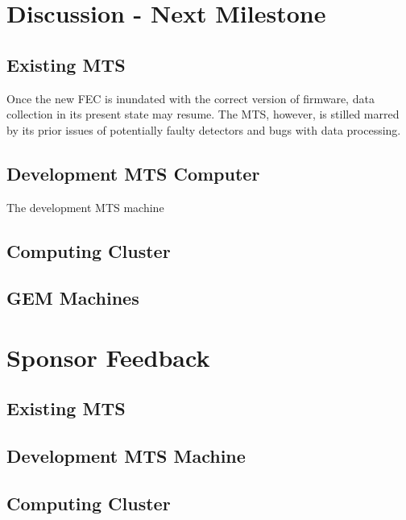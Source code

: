 \documentclass[12pt]{article}
\newcommand\tab[1][1cm]{\hspace*{#1}}
\begin{document}
\section{Discussion - Next Milestone}

\subsection{Existing MTS}

\tab Once the new FEC is inundated with the correct version of firmware, data
collection in its present state may resume. The MTS, however, is stilled marred
by its prior issues of potentially faulty detectors and bugs with data
processing.

\subsection{Development MTS Computer}

\tab The development MTS machine

\subsection{Computing Cluster}



\subsection{GEM Machines}


\section{Sponsor Feedback}

\subsection{Existing MTS}

\vspace{1in}

\subsection{Development MTS Machine}

\vspace{1in}

\subsection{Computing Cluster}
\end{document}
